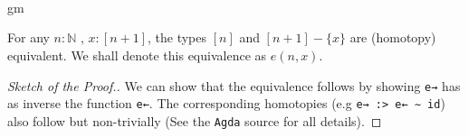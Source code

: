 \documentclass[11pt, a4paper, oneside]{amsart}
\begin{document}
\begin{definition}
\begin{code}[hide]
\AgdaSymbol{\}}\AgdaSpace{}%
\AgdaSymbol{\{}\AgdaSymbol{\}}\AgdaSpace{}%
\AgdaSymbol{=}\AgdaSpace{}%
\<%
\\
%
\>[2]\AgdaSpace{}%
\AgdaSymbol{\{}\AgdaSpace{}%
\AgdaSymbol{\}}\AgdaSpace{}%
\AgdaSymbol{\{}\AgdaSpace{}%
\AgdaSymbol{\}}\AgdaSpace{}%
\AgdaSymbol{\{}\AgdaSpace{}%
\AgdaSymbol{\}}\AgdaSpace{}%
\AgdaSymbol{\{}\AgdaSymbol{\}}\AgdaSpace{}%
\AgdaSymbol{=}\AgdaSpace{}%
\<%
\\
%
\>[2]\AgdaSpace{}%
\AgdaSymbol{\{}\AgdaSpace{}%
\AgdaSymbol{\}}\AgdaSpace{}%
\AgdaSymbol{\{}\AgdaSpace{}%
\AgdaSymbol{\}}\AgdaSpace{}%
\AgdaSymbol{\{}\AgdaSpace{}%
\AgdaSymbol{\}}\AgdaSpace{}%
\AgdaSymbol{\{}\AgdaSymbol{\}}\AgdaSpace{}%
\AgdaSymbol{=}\AgdaSpace{}%
\<%
\\
%
\>[2]\AgdaSpace{}%
\AgdaSymbol{\{}\AgdaSpace{}%
\AgdaSymbol{\}}\AgdaSpace{}%
\AgdaSymbol{\{}\AgdaSpace{}%
\AgdaSymbol{\}}\AgdaSpace{}%
\AgdaSymbol{\{}\AgdaSpace{}%
\AgdaSymbol{\}}\AgdaSpace{}%
\AgdaSymbol{\{}\AgdaSymbol{\}}\AgdaSpace{}%
\AgdaSymbol{=}\AgdaSpace{}%
\<%
\end{code}

\end{definition}
gm
\begin{lemma}\label{equivalence-e}
For any $n : ℕ$ , $x : [ n + 1 ]$,
the types $[n]$ and $[ n + 1] - \{x\}$ are (homotopy) equivalent.
We shall denote this equivalence as $e(n,x)$.
\end{lemma}

\begin{proof}[Sketch of the Proof.]
We can show that the equivalence follows by showing  \texttt{e→} has as inverse
the function \texttt{e←}. The corresponding homotopies (e.g \texttt{e→ :> e← ∼ id})
also follow but non-trivially (See the \texttt{Agda} source for all details).
\end{proof}
\end{document}
